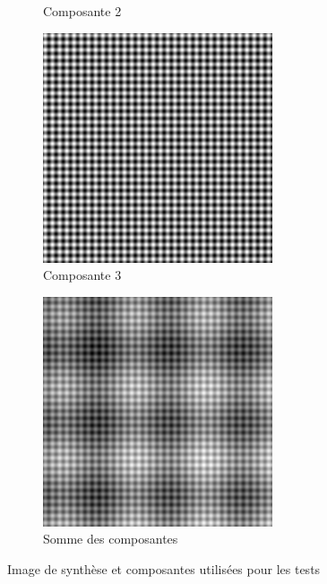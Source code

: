 \begin{figure}
\begin{subfigure}{.30\textwidth}
  \caption{Composante 2}
\end{subfigure}
\begin{subfigure}{.30\textwidth}
  \centering
  \includegraphics[width=.9\linewidth]{img/s_2}
  \caption{Composante 3}
\end{subfigure}
\begin{subfigure}{.30\textwidth}
  \centering
  \includegraphics[width=.9\linewidth]{img/s_c}
  \caption{Somme des composantes}
\end{subfigure}
\caption{Image de synthèse et composantes utilisées pour les tests}
\label{fig:synthesis}
\end{figure}

